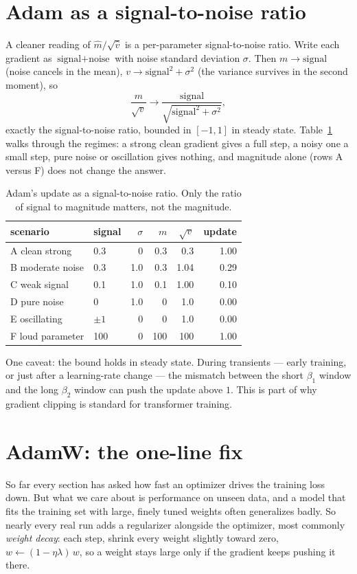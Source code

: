 \documentclass[10pt,conference]{IEEEtran}
\begin{document}
\section{Adam as a signal-to-noise ratio}
A cleaner reading of $\hat m/\sqrt{\hat v}$ is a per-parameter signal-to-noise
ratio. Write each gradient as $\text{signal}+\text{noise}$ with noise standard
deviation $\sigma$. Then $m \to \text{signal}$ (noise cancels in the mean),
$v \to \text{signal}^2+\sigma^2$ (the variance survives in the second moment), so
\begin{equation}
\frac{m}{\sqrt{v}} \to \frac{\text{signal}}{\sqrt{\text{signal}^2+\sigma^2}},
\end{equation}
exactly the signal-to-noise ratio, bounded in $[-1,1]$ in steady state. Table~\ref{tab:snr}
walks through the regimes: a strong clean gradient gives a full step, a noisy one
a small step, pure noise or oscillation gives nothing, and magnitude alone (rows
A versus F) does not change the answer.

\begin{table}[t]
\centering
\caption{Adam's update as a signal-to-noise ratio. Only the ratio of signal to
magnitude matters, not the magnitude.}
\label{tab:snr}
\small
\begin{tabular}{@{}llrrrr@{}}
\toprule
scenario & signal & $\sigma$ & $m$ & $\sqrt{v}$ & update \\
\midrule
A clean strong   & 0.3 & 0   & 0.3 & 0.3  & 1.00 \\
B moderate noise & 0.3 & 1.0 & 0.3 & 1.04 & 0.29 \\
C weak signal    & 0.1 & 1.0 & 0.1 & 1.00 & 0.10 \\
D pure noise     & 0   & 1.0 & 0   & 1.0  & 0.00 \\
E oscillating    & $\pm1$ & 0 & 0 & 1.0 & 0.00 \\
F loud parameter & 100 & 0   & 100 & 100  & 1.00 \\
\bottomrule
\end{tabular}
\end{table}

One caveat: the bound holds in steady state. During transients --- early
training, or just after a learning-rate change --- the mismatch between the short
$\beta_1$ window and the long $\beta_2$ window can push the update above $1$. This
is part of why gradient clipping is standard for transformer training.

\section{AdamW: the one-line fix}
So far every section has asked how fast an optimizer drives the training loss
down. But what we care about is performance on unseen data, and a model that fits
the training set with large, finely tuned weights often generalizes badly. So
nearly every real run adds a regularizer alongside the optimizer, most commonly
\emph{weight decay}: each step, shrink every weight slightly toward zero,
$w \leftarrow (1-\eta\lambda)\, w$, so a weight stays large only if the gradient
keeps pushing it there.
\end{document}
